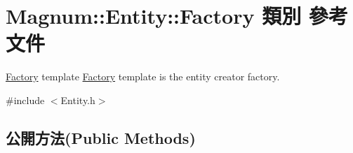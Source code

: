 \hypertarget{class_magnum_1_1_entity_1_1_factory}{}\section{Magnum\+:\+:Entity\+:\+:Factory 類別 參考文件}
\label{class_magnum_1_1_entity_1_1_factory}


\hyperlink{class_magnum_1_1_entity_1_1_factory}{Factory} template \hyperlink{class_magnum_1_1_entity_1_1_factory}{Factory} template is the entity creator factory.  




{\ttfamily \#include $<$Entity.\+h$>$}

\subsection*{公開方法(Public Methods)}
